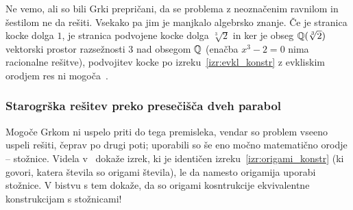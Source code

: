 Ne vemo, ali so bili Grki prepričani, da se problema z neoznačenim ravnilom in šestilom ne da rešiti. Vsekako pa jim je manjkalo algebrsko znanje. Če je stranica kocke dolga $1$, je stranica podvojene kocke dolga $\sqrt[3]{2}$ in ker je obseg $\mathbb Q(\sqrt[3]{2})$ vektorski prostor razsežnosti $3$ nad obsegom $\mathbb Q$ (enačba $ x^3 - 2 = 0 $ nima racionalne rešitve), podvojitev kocke po izreku~\ref{izr:evkl_konstr} z evkliskim orodjem res ni mogoča~\cite[str. 78]{jerman1998}.

\subsubsection*{Starogrška rešitev preko presečišča dveh parabol}

Mogoče Grkom ni uspelo priti do tega premisleka, vendar so problem vseeno uspeli rešiti, čeprav po drugi poti; uporabili so še eno močno matematično orodje -- stožnice. Videla v~\cite{videla1997} dokaže izrek, ki je identičen izreku~\ref{izr:origami_konstr} (ki govori, katera števila so origami števila), le da namesto origamija uporabi stožnice. V bistvu s tem dokaže, da so origami kosntrukcije ekvivalentne konstrukcijam s stožnicami!

